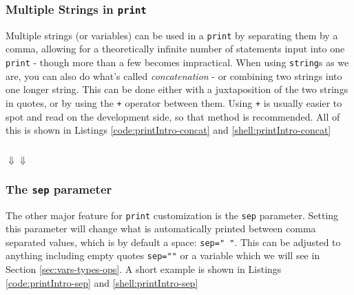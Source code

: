 \documentclass{book}
\newcommand{\pythonSub}[5]{
    \usemintedstyle{autumn}
    \begin{listing}[htb]
        \begin{mdframed}[backgroundcolor=codebg]
            \inputminted[firstline=#2, lastline=#3, linenos]{python}{#1}
        \end{mdframed}
        \caption{#4}
        \label{#5}
    \end{listing}
}
\newcommand{\shellSub}[5]{
    \begin{listing}[htb]
        \begin{mdframed}[backgroundcolor=codebg]
              
        \end{mdframed}
        \caption{#4}
        \label{#5}
    \end{listing}
}
\newcommand{\shellSubH}[5]{
    \begin{listing}[H]
        \begin{mdframed}[backgroundcolor=codebg]
              
        \end{mdframed}
        \caption{#4}
        \label{#5}
    \end{listing}
}
\newcommand{\pythonAndShellSub}[8]{
\usemintedstyle{autumn}
    \begin{listing}[htb]
 	   \begin{mdframed}[backgroundcolor=codebg]
            \inputminted[firstline=#2, lastline=#3, linenos]{python}{#1}
        \end{mdframed}
        \hspace{5em}$\Downarrow$\hfill$\Downarrow$\hspace{5em}
        \begin{mdframed}[backgroundcolor=codebg]
              
        \end{mdframed}
        \caption{#7}
        \label{#8}
    \end{listing}
}
\begin{document}
\subsubsection{Multiple Strings in \texttt{print}}\label{sec:printMulti}

Multiple strings (or variables) can be used in a \texttt{print} by separating them by a comma, allowing for a theoretically infinite number of statements input into one \texttt{print} - though more than a few becomes impractical. When using \texttt{string}s as we are, you can also do what's called \emph{concatenation} - or combining two strings into one longer string. This can be done either with a juxtaposition of the two strings in quotes, or by using the \texttt{+} operator between them. Using \texttt{+} is usually easier to spot and read on the development side, so that method is recommended. All of this is shown in Listings \ref{code:printIntro-concat} and \ref{shell:printIntro-concat}

%

\pythonAndShellSub{../../../docCode/chapter2/section2/printIntro.py}
{18}{24}
{../../../docCode/chapter2/section2/printIntro.txt}
{10}{15}
{}
{pyshell:printIntro-concat}

\subsubsection{The \texttt{sep} parameter}\label{sec:printSep}

The other major feature for \texttt{print} customization is the \texttt{sep} parameter. Setting this parameter will change what is automatically printed between comma separated values, which is by default a space: \texttt{sep=" "}. This can be adjusted to anything including empty quotes \texttt{sep=""} or a variable which we will see in Section \ref{sec:vars-types-ops}. A short example is shown in Listings \ref{code:printIntro-sep} and \ref{shell:printIntro-sep}

%
\end{document}
